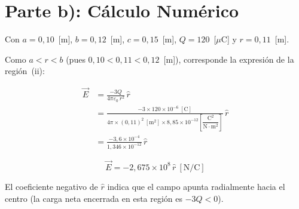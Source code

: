 \documentclass[12pt,letterpaper]{article}
\begin{document}
\section*{Parte b): C\'alculo Num\'erico}

Con $a = 0{,}10$~[m], $b = 0{,}12$~[m], $c = 0{,}15$~[m], $Q = 120$~[$\mu$C] y $r = 0{,}11$~[m].

Como $a < r < b$ (pues $0{,}10 < 0{,}11 < 0{,}12$~[m]), corresponde la expresi\'on de la regi\'on~(ii):

\begin{align*}
    \vec{E} &= \frac{-3Q}{4\pi\varepsilon_0\,r^2}\,\hat{r} \\[8pt]
            &= \frac{-3 \times 120\times10^{-6}\ [\text{C}]}
                   {4\pi \times (0{,}11)^2\ [\text{m}^2]
                    \times 8{,}85\times10^{-12}
                    \left[\dfrac{\text{C}^2}{\text{N}\cdot\text{m}^2}\right]}\,\hat{r} \\[8pt]
            &= \frac{-3{,}6\times10^{-4}}{1{,}346\times10^{-12}}\,\hat{r}
\end{align*}

\[
    \boxed{\vec{E} = -2{,}675 \times 10^{8}\,\hat{r}\ [\text{N/C}]}
\]

El coeficiente negativo de $\hat{r}$ indica que el campo apunta radialmente hacia el centro
(la carga neta encerrada en esta regi\'on es $-3Q < 0$).
\end{document}

